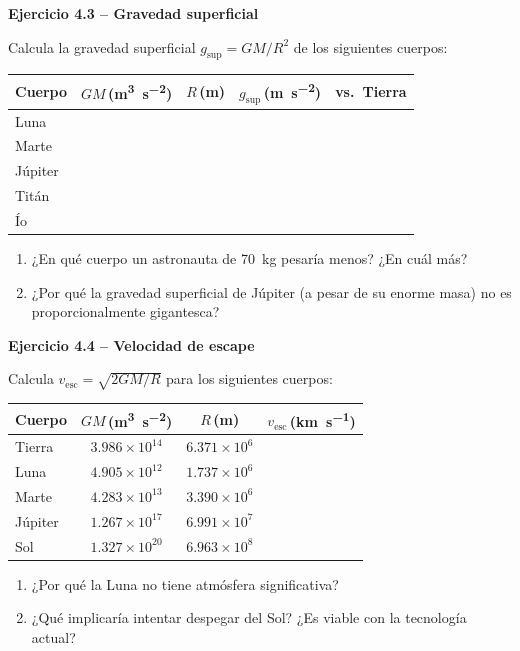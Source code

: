 \documentclass[11pt,a4paper]{article}
\newenvironment{cajaEjercicio}[1][]{\par\medskip\noindent\textbf{#1}\par\smallskip}{\par\medskip}
\theoremstyle{definition}
\newcommand{\velesc}{\ensuremath{v_{\text{esc}}}}
\begin{document}
\begin{cajaEjercicio}[Ejercicio 4.3 -- Gravedad superficial]
Calcula la gravedad superficial $g_{\text{sup}} = GM/R^{2}$ de los siguientes cuerpos:

\begin{center}
\begin{tabular}{@{}lcccc@{}}
\toprule
\textbf{Cuerpo} & $GM$\,(\si{\cubic\metre\per\square\second}) & $R$\,(\si{\metre}) & $g_{\text{sup}}$\,(\si{\metre\per\square\second}) & \textbf{vs.\ Tierra} \\
\midrule
Luna    & & & & \\
Marte   & & & & \\
Júpiter & & & & \\
Titán   & & & & \\
Ío      & & & & \\
\bottomrule
\end{tabular}
\end{center}

\begin{enumerate}[label=\alph*),leftmargin=*]
  \item ¿En qué cuerpo un astronauta de \SI{70}{\kilo\gram} pesaría menos? ¿En cuál más?
  \item ¿Por qué la gravedad superficial de Júpiter (a pesar de su enorme masa) no es proporcionalmente gigantesca?
\end{enumerate}
\end{cajaEjercicio}

\begin{cajaEjercicio}[Ejercicio 4.4 -- Velocidad de escape]
Calcula $\velesc = \sqrt{2GM/R}$ para los siguientes cuerpos:

\begin{center}
\begin{tabular}{@{}lccc@{}}
\toprule
\textbf{Cuerpo} & $GM$\,(\si{\cubic\metre\per\square\second}) & $R$\,(\si{\metre}) & $\velesc$\,(\si{\kilo\metre\per\second}) \\
\midrule
Tierra  & $3.986\times10^{14}$ & $6.371\times10^{6}$ & \\
Luna    & $4.905\times10^{12}$ & $1.737\times10^{6}$ & \\
Marte   & $4.283\times10^{13}$ & $3.390\times10^{6}$ & \\
Júpiter & $1.267\times10^{17}$ & $6.991\times10^{7}$ & \\
Sol     & $1.327\times10^{20}$ & $6.963\times10^{8}$ & \\
\bottomrule
\end{tabular}
\end{center}

\begin{enumerate}[label=\alph*),leftmargin=*]
  \item ¿Por qué la Luna no tiene atmósfera significativa?
  \item ¿Qué implicaría intentar despegar del Sol? ¿Es viable con la tecnología actual?
\end{enumerate}
\end{cajaEjercicio}
\end{document}
